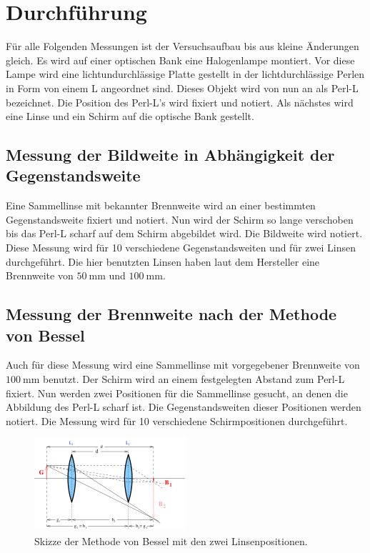 \section{Durchführung}
\label{sec:Durchführung}

Für alle Folgenden Messungen ist der Versuchsaufbau bis aus kleine Änderungen gleich.
Es wird auf einer optischen Bank eine Halogenlampe montiert.
Vor diese Lampe wird eine lichtundurchlässige Platte gestellt in der lichtdurchlässige Perlen in Form von einem L angeordnet sind.
Dieses Objekt wird von nun an als Perl-L bezeichnet.
Die Position des Perl-L's wird fixiert und notiert.
Als nächstes wird eine Linse und ein Schirm auf die optische Bank gestellt.

\subsection{Messung der Bildweite in Abhängigkeit der Gegenstandsweite}
\label{ssec:Durchführung_brennweite}

Eine Sammellinse mit bekannter Brennweite wird an einer bestimmten Gegenstandsweite fixiert und notiert.
Nun wird der Schirm so lange verschoben bis das Perl-L scharf auf dem Schirm abgebildet wird.
Die Bildweite wird notiert.
Diese Messung wird für 10 verschiedene Gegenstandsweiten und für zwei Linsen durchgeführt.
Die hier benutzten Linsen haben laut dem Hersteller eine Brennweite von $\SI{50}{\milli\metre}$ und $\SI{100}{\milli\metre}$.

\subsection{Messung der Brennweite nach der Methode von Bessel}
\label{ssec:Durchführung_bessel}

Auch für diese Messung wird eine Sammellinse mit vorgegebener Brennweite von $\SI{100}{\milli\metre}$ benutzt.
Der Schirm wird an einem festgelegten Abstand zum Perl-L fixiert.
Nun werden zwei Positionen für die Sammellinse gesucht, an denen die Abbildung des Perl-L scharf ist.
Die Gegenstandsweiten dieser Positionen werden notiert.
Die Messung wird für 10 verschiedene Schirmpositionen durchgeführt.

\begin{figure}
    \centering
    \includegraphics[width=0.5\textwidth]{images/skizze_bessel.png}
    \caption{Skizze der Methode von Bessel mit den zwei Linsenpositionen.\cite{V408}}
    \label{fig:skizze_bessel}
\end{figure}


